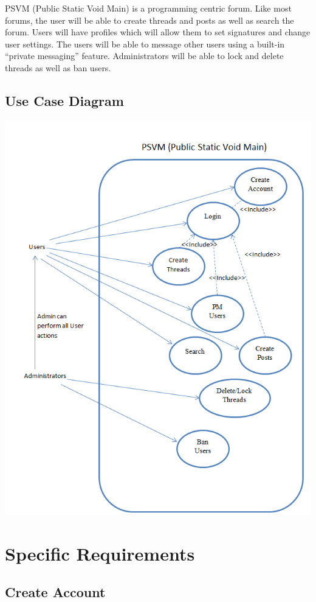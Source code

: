 \documentclass[12pt]{scrartcl}
\begin{document}
PSVM (Public Static Void Main) is a programming centric forum. Like most forums, the user will be able to create threads and posts as well as search the forum. Users will have profiles which will allow them to set signatures and change user settings.  The users will be able to message other users using a built-in “private messaging” feature. Administrators will be able to lock and delete threads as well as ban users.

\subsection{Use Case Diagram}

\includegraphics{use-case.PNG}

\section{Specific Requirements}
\subsection{Create Account}
\end{document}
